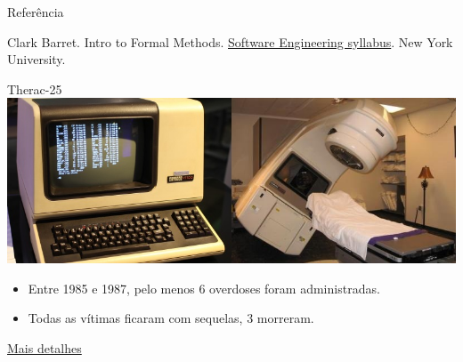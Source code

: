 
\frame{\maketitle}

\begin{frame}{Referência}
  \begin{thebibliography}{10}
    \beamertemplatebookbibitems
    Clark Barret.
    \newblock Intro to Formal Methods.
    \newblock \href{https://cs.nyu.edu/courses/spring08/V22.0474-001/syllabus.html}{Software Engineering syllabus}.
    \newblock New York University.
  \end{thebibliography}  
\end{frame}

\begin{frame}{Therac-25}
  \includegraphics[scale=.5]{therac25.png}
  \bigskip
  
  \begin{itemize}
  \item Entre 1985 e 1987, pelo menos 6 overdoses foram administradas.
  \item Todas as vítimas ficaram com sequelas, 3 morreram.
  \end{itemize}\bigskip

  \href{https://www.youtube.com/watch?v=qgusHewRFgA}{Mais detalhes}
  
\end{frame}

